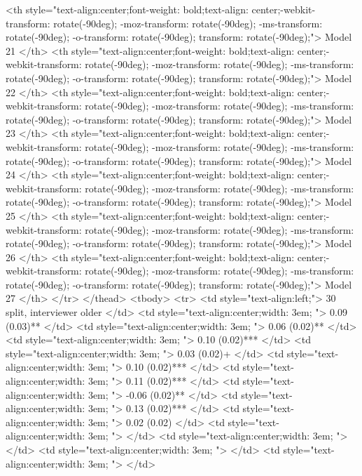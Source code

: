    <th style="text-align:center;font-weight: bold;text-align: center;-webkit-transform: rotate(-90deg); -moz-transform: rotate(-90deg); -ms-transform: rotate(-90deg); -o-transform: rotate(-90deg); transform: rotate(-90deg);"> Model 21 </th>
   <th style="text-align:center;font-weight: bold;text-align: center;-webkit-transform: rotate(-90deg); -moz-transform: rotate(-90deg); -ms-transform: rotate(-90deg); -o-transform: rotate(-90deg); transform: rotate(-90deg);"> Model 22 </th>
   <th style="text-align:center;font-weight: bold;text-align: center;-webkit-transform: rotate(-90deg); -moz-transform: rotate(-90deg); -ms-transform: rotate(-90deg); -o-transform: rotate(-90deg); transform: rotate(-90deg);"> Model 23 </th>
   <th style="text-align:center;font-weight: bold;text-align: center;-webkit-transform: rotate(-90deg); -moz-transform: rotate(-90deg); -ms-transform: rotate(-90deg); -o-transform: rotate(-90deg); transform: rotate(-90deg);"> Model 24 </th>
   <th style="text-align:center;font-weight: bold;text-align: center;-webkit-transform: rotate(-90deg); -moz-transform: rotate(-90deg); -ms-transform: rotate(-90deg); -o-transform: rotate(-90deg); transform: rotate(-90deg);"> Model 25 </th>
   <th style="text-align:center;font-weight: bold;text-align: center;-webkit-transform: rotate(-90deg); -moz-transform: rotate(-90deg); -ms-transform: rotate(-90deg); -o-transform: rotate(-90deg); transform: rotate(-90deg);"> Model 26 </th>
   <th style="text-align:center;font-weight: bold;text-align: center;-webkit-transform: rotate(-90deg); -moz-transform: rotate(-90deg); -ms-transform: rotate(-90deg); -o-transform: rotate(-90deg); transform: rotate(-90deg);"> Model 27 </th>
  </tr>
 </thead>
<tbody>
  <tr>
   <td style="text-align:left;"> 30 split, interviewer older </td>
   <td style="text-align:center;width: 3em; "> 0.09 (0.03)** </td>
   <td style="text-align:center;width: 3em; "> 0.06 (0.02)** </td>
   <td style="text-align:center;width: 3em; "> 0.10 (0.02)*** </td>
   <td style="text-align:center;width: 3em; "> 0.03 (0.02)+ </td>
   <td style="text-align:center;width: 3em; "> 0.10 (0.02)*** </td>
   <td style="text-align:center;width: 3em; "> 0.11 (0.02)*** </td>
   <td style="text-align:center;width: 3em; "> -0.06 (0.02)** </td>
   <td style="text-align:center;width: 3em; "> 0.13 (0.02)*** </td>
   <td style="text-align:center;width: 3em; "> 0.02 (0.02) </td>
   <td style="text-align:center;width: 3em; ">  </td>
   <td style="text-align:center;width: 3em; ">  </td>
   <td style="text-align:center;width: 3em; ">  </td>
   <td style="text-align:center;width: 3em; ">  </td>
